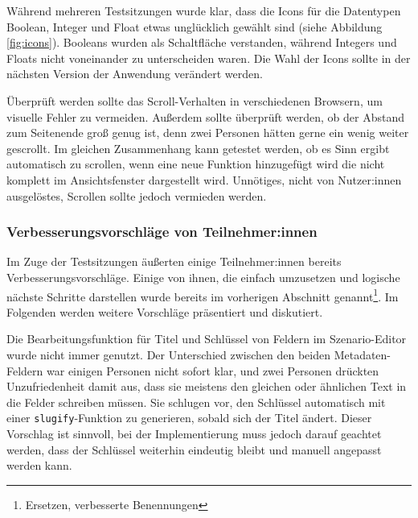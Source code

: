 Während mehreren Testsitzungen wurde klar, dass die Icons für die Datentypen Boolean, Integer und Float etwas unglücklich gewählt sind (siehe Abbildung \ref{fig:icons}). Booleans wurden als Schaltfläche verstanden, während Integers und Floats nicht voneinander zu unterscheiden waren. Die Wahl der Icons sollte in der nächsten Version der Anwendung verändert werden.

Überprüft werden sollte das Scroll-Verhalten in verschiedenen Browsern, um visuelle Fehler zu vermeiden. Außerdem sollte überprüft werden, ob der Abstand zum Seitenende groß genug ist, denn zwei Personen hätten gerne ein wenig weiter gescrollt. Im gleichen Zusammenhang kann getestet werden, ob es Sinn ergibt automatisch zu scrollen, wenn eine neue Funktion hinzugefügt wird die nicht komplett im Ansichtsfenster dargestellt wird. Unnötiges, nicht von Nutzer:innen ausgelöstes, Scrollen sollte jedoch vermieden werden.



\subsubsection{Verbesserungsvorschläge von Teilnehmer:innen}

Im Zuge der Testsitzungen äußerten einige Teilnehmer:innen bereits Verbesserungsvorschläge. Einige von ihnen, die einfach umzusetzen und logische nächste Schritte darstellen wurde bereits im vorherigen Abschnitt genannt\footnote{Ersetzen, verbesserte Benennungen}. Im Folgenden werden weitere Vorschläge präsentiert und diskutiert.

Die Bearbeitungsfunktion für Titel und Schlüssel von Feldern im Szenario-Editor wurde nicht immer genutzt. Der Unterschied zwischen den beiden Metadaten-Feldern war einigen Personen nicht sofort klar, und zwei Personen drückten Unzufriedenheit damit aus, dass sie meistens den gleichen oder ähnlichen Text in die Felder schreiben müssen. Sie schlugen vor, den Schlüssel automatisch mit einer \texttt{slugify}-Funktion zu generieren, sobald sich der Titel ändert. Dieser Vorschlag ist sinnvoll, bei der Implementierung muss jedoch darauf geachtet werden, dass der Schlüssel weiterhin eindeutig bleibt und manuell angepasst werden kann.

